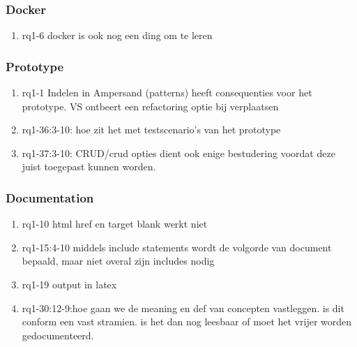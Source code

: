 \subsubsection{Docker}
\begin{comment}
plaats hier de afgehandelde items.
\end{comment}
\begin{enumerate}
    \item rq1-6 docker is ook nog een ding om te leren

\end{enumerate}

\subsubsection{Prototype}
\begin{comment}
plaats hier de afgehandelde items.
\end{comment}
\begin{enumerate}
    \item rq1-1 Indelen in Ampersand (patterns) heeft consequenties voor het prototype. VS ontbeert een refactoring optie bij verplaatsen
    \item rq1-36:3-10: hoe zit het met testscenario's van het prototype
    \item rq1-37:3-10: CRUD/crud opties dient ook enige bestudering voordat deze juist toegepast kunnen worden.
\end{enumerate}

\subsubsection{Documentation}
\begin{comment}
plaats hier de afgehandelde items.
\end{comment}
\begin{enumerate}
    \item rq1-10 html href en target blank werkt niet    
    \item rq1-15:4-10 middels include statements wordt de volgorde van document bepaald, maar niet overal zijn includes nodig
    \item rq1-19 output in latex 
    \item rq1-30:12-9:hoe gaan we de meaning en def van concepten vastleggen. is dit conform een vast stramien. is het dan nog leesbaar of moet het vrijer worden gedocumenteerd.
    
\end{enumerate}

